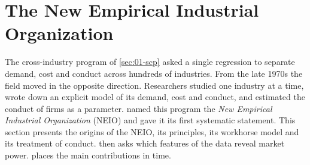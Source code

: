 \section{The New Empirical Industrial Organization}\label{sec:01-neio}

The cross-industry program of \cref{sec:01-scp} asked a single regression to separate demand, cost and conduct
across hundreds of industries. From the late 1970s the field moved in the opposite direction. Researchers studied
one industry at a time, wrote down an explicit model of its demand, cost and conduct, and estimated the conduct of
firms as a parameter. \citet{Bresnahan1989} named this program the \emph{New Empirical Industrial Organization}
(NEIO) and gave it its first systematic statement. This section presents the origins of the NEIO, its principles, its
workhorse model and its treatment of conduct.  then asks which features of the data
reveal market power.  places the main contributions in time.

